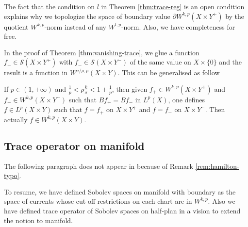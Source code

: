 \begin{remark}
The fact that the condition on \(l\) in Theorem \ref{thm:trace-reg} is an open condition
explains why we topologize the space of boundary value  \(\partial W^{k,p}(X\times Y^+)\) by the quotient \(W^{k,p}\)-norm instead of any \(W^{l,p}\)-norm. Also, we have completeness for free.
\end{remark}


In the proof of Theorem \ref{thm:vanishing-trace}, we glue a function \(f_+\in
\mathcal{S}(X\times Y^+)\) with \(f_-\in \mathcal{S}(X\times Y^-)\) of the same value
on \(X\times \{0\}\) and the result is a function in \(W^{\sigma/\rho,p}(X\times Y)\). This can be generalised as follow

\begin{theorem}
\label{thm:patching}
If \(p\in (1,+\infty)\) and \(\frac{1}{p} < \rho \frac{k}{\sigma} < 1+\frac{1}{p}\),
then given \(f_+\in W^{k,p}(X\times Y^+)\) and \(f_-\in W^{k,p}(X\times Y^-)\) such
that \(B f_+ = B f_-\) in \(L^p(X)\), one defines \(f\in L^p(X\times Y)\) such that \(f=
f_+\) on \(X\times Y^+\) and \(f= f_-\) on \(X\times Y^-\). Then actually \(f\in
W^{k,p}(X\times Y)\).
\end{theorem}

\subsection{Trace operator on manifold}
\label{sec:orgbb83fb6}

The following paragraph does not appear in \cite{hamilton_harmonic_1975} because of Remark \ref{rem:hamilton-typo}.

To resume, we have defined Sobolev spaces on manifold with boundary as the space of
currents whose cut-off restrictions on each chart are in \(W^{k,p}\). Also we have defined
trace operator of Sobolev spaces on half-plan in a vision to extend the notion to
manifold.

